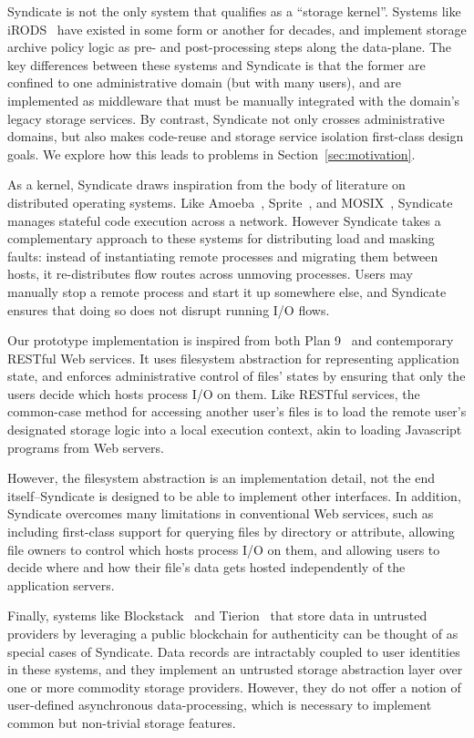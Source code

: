 Syndicate is not the only system that qualifies as a ``storage kernel''.
Systems like iRODS~\cite{irods} have existed in some form or another for
decades, and implement storage archive policy logic as pre- and post-processing steps
along the data-plane.  The key differences between these systems and Syndicate is
that the former are confined to one administrative domain (but with many users), and
are implemented as middleware that must be manually integrated with the domain's
legacy storage services.  By contrast, Syndicate not only crosses administrative
domains, but also makes code-reuse and storage service isolation first-class
design goals.  We explore how this leads to problems in
Section~\ref{sec:motivation}.

As a kernel, Syndicate draws inspiration from the body of literature on distributed
operating systems.  Like Amoeba~\cite{amoeba}, Sprite~\cite{sprite}, and
MOSIX~\cite{mosix}, Syndicate manages stateful code
execution across a network.  However Syndicate takes a complementary approach to
these systems for distributing load and masking faults:  instead of instantiating remote processes
and migrating them between hosts, it re-distributes flow routes across unmoving
processes.  Users may manually stop a remote process and start it up somewhere
else, and Syndicate ensures that doing so does not disrupt running I/O flows.

Our prototype implementation is inspired from both Plan
9~\cite{plan9} and contemporary RESTful Web services.
It uses filesystem abstraction for representing
application state, and enforces administrative control of files' states by
ensuring that only the users decide which hosts process I/O on them.
Like RESTful services, the common-case method for accessing another user's files
is to load the remote user's designated storage logic into a local execution
context, akin to loading Javascript programs from Web servers.

However, the filesystem abstraction is an
implementation detail, not the end itself--Syndicate is designed to be able to
implement other interfaces.  In addition, Syndicate overcomes many
limitations in conventional Web services, such as including
first-class support for querying files by directory or attribute, allowing
file owners to control which hosts process I/O on them, and allowing users to
decide where and how their file's data gets hosted independently of the
application servers.

Finally, systems like Blockstack~\cite{blockstack} and Tierion~\cite{tierion}
that store data in untrusted providers by leveraging a public blockchain for
authenticity can be thought of as special cases of Syndicate.  Data records are intractably coupled
to user identities in these systems, and they implement an untrusted storage abstraction layer over
one or more commodity storage providers.  However, they do not offer a notion of
user-defined asynchronous data-processing, which is necessary to implement common but
non-trivial storage features.

